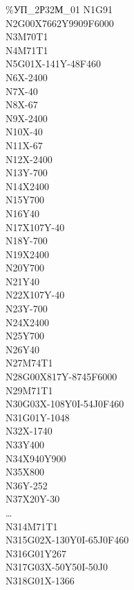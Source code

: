 \begin{figure}
  \scriptsize
  \begin{multicols}{3}
    \%УП\_2Р32М\_01
    N1G91 \\
    N2G00X7662Y9909F6000 \\
    N3M70T1 \\
    N4M71T1 \\
    N5G01X-141Y-48F460 \\
    N6X-2400  \\
    N7X-40  \\
    N8X-67  \\
    N9X-2400  \\
    N10X-40 \\
    N11X-67 \\
    N12X-2400 \\
    N13Y-700  \\
    N14X2400  \\
    N15Y700 \\
    N16Y40  \\
    N17X107Y-40 \\
    N18Y-700  \\
    N19X2400  \\
    N20Y700 \\
    N21Y40  \\
    N22X107Y-40 \\
    N23Y-700  \\
    N24X2400  \\
    N25Y700 \\
    N26Y40  \\
    N27M74T1  \\
    N28G00X817Y-8745F6000 \\
    N29M71T1  \\
    N30G03X-108Y0I-54J0F460 \\
    N31G01Y-1048  \\
    N32X-1740 \\
    N33Y400 \\
    N34X940Y900 \\
    N35X800 \\
    N36Y-252  \\
    N37X20Y-30  \\
    \dots \\
    N314M71T1 \\
    N315G02X-130Y0I-65J0F460  \\
    N316G01Y267 \\
    N317G03X-50Y50I-50J0  \\
    N318G01X-1366 \\

\end{multicols}
\end{figure}
